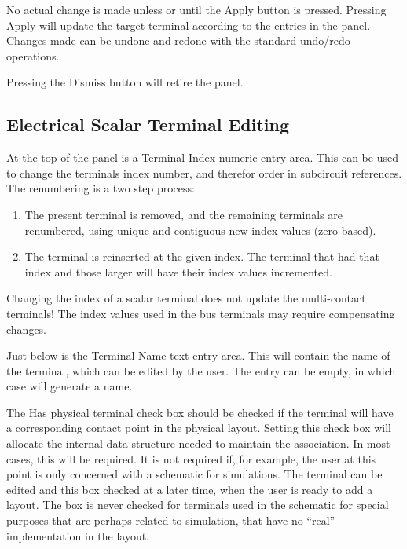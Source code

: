 No actual change is made unless or until the {\cb Apply} button is
pressed.  Pressing {\cb Apply} will update the target terminal
according to the entries in the panel.  Changes made can be undone and
redone with the standard {\Xic} undo/redo operations.

Pressing the {\cb Dismiss} button will retire the panel.

\subsection{Electrical Scalar Terminal Editing}

At the top of the panel is a {\cb Terminal Index} numeric entry area. 
This can be used to change the terminals index number, and therefor
order in subcircuit references.  The renumbering is a two step
process:

\begin{enumerate}
\item{The present terminal is removed, and the remaining terminals are
renumbered, using unique and contiguous new index values (zero based).}

\item{The terminal is reinserted at the given index.  The terminal
that had that index and those larger will have their index values
incremented.}
\end{enumerate}

Changing the index of a scalar terminal does {\cb not} update the
multi-contact terminals!  The index values used in the bus terminals
may require compensating changes.

Just below is the {\cb Terminal Name} text entry area.  This will
contain the name of the terminal, which can be edited by the user. 
The entry can be empty, in which case {\Xic} will generate a name.

The {\cb Has physical terminal} check box should be checked if the
terminal will have a corresponding contact point in the physical
layout.  Setting this check box will allocate the internal data
structure needed to maintain the association.  In most cases, this
will be required.  It is not required if, for example, the user at
this point is only concerned with a schematic for simulations.  The
terminal can be edited and this box checked at a later time, when the
user is ready to add a layout.  The box is never checked for terminals
used in the schematic for special purposes that are perhaps related to
simulation, that have no ``real'' implementation in the layout.


